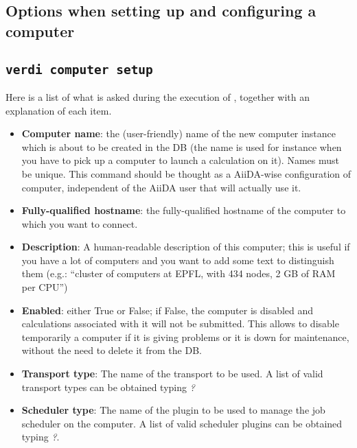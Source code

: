 \begin{appendices}
\section{\label{app:computersetup}Options when setting up and configuring a computer}
\subsection{\texttt{verdi computer setup}} 
Here is a list of what is asked during the execution of , together with an explanation of each item.

\begin{itemize}

\item {} 
\textbf{Computer name}: the (user-friendly) name of the new computer instance
which is about to be created in the DB (the name is used for instance when
you have to pick up a computer to launch a calculation on it). Names must
be unique. This command should be thought as a AiiDA-wise configuration of
computer, independent of the AiiDA user that will actually use it.

\item {} 
\textbf{Fully-qualified hostname}: the fully-qualified hostname of the computer
to which you want to connect. 

\item {} 
\textbf{Description}:  A human-readable description of this computer; this is
useful if you have a lot of computers and you want to add some text to
distinguish them (e.g.: ``cluster of computers at EPFL, with 434 nodes, 2 GB of RAM per CPU'')

\item {} 
\textbf{Enabled}: either True or False; if False, the computer is disabled
and calculations associated with it will not be submitted. This allows to
disable temporarily a computer if it is giving problems or it is down for
maintenance, without the need to delete it from the DB.

\item {} 
\textbf{Transport type}: The name of the transport to be used. A list of valid
transport types can be obtained typing \textit{?}

\item {} 
\textbf{Scheduler type}: The name of the plugin to be used to manage the
job scheduler on the computer. A list of valid
scheduler plugins can be obtained typing \textit{?}.


\end{itemize}
\end{appendices}
